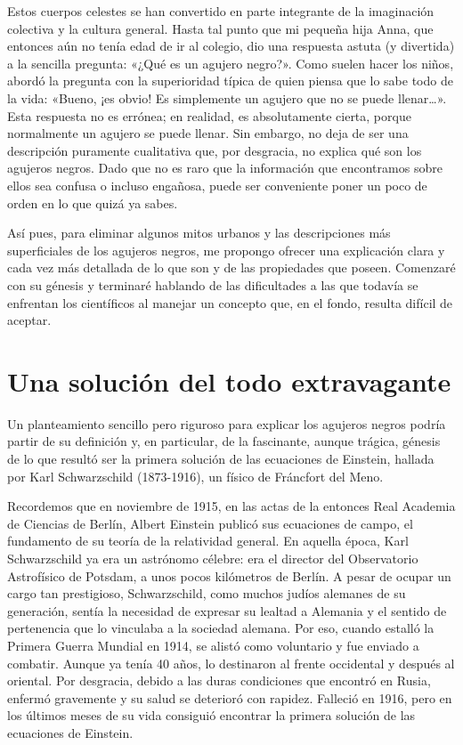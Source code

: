 Estos cuerpos celestes se han convertido en parte integrante de la imaginación colectiva y la cultura general. Hasta tal punto que mi pequeña hija Anna, que entonces aún no tenía edad de ir al colegio, dio una respuesta astuta (y divertida) a la sencilla pregunta: «¿Qué es un agujero negro?». Como suelen hacer los niños, abordó la pregunta con la superioridad típica de quien piensa que lo sabe todo de la vida: «Bueno, ¡es obvio! Es simplemente un agujero que no se puede llenar…». Esta respuesta no es errónea; en realidad, es absolutamente cierta, porque normalmente un agujero se puede llenar. Sin embargo, no deja de ser una descripción puramente cualitativa que, por desgracia, no explica qué son los agujeros negros. Dado que no es raro que la información que encontramos sobre ellos sea confusa o incluso engañosa, puede ser conveniente poner un poco de orden en lo que quizá ya sabes.

Así pues, para eliminar algunos mitos urbanos y las descripciones más superficiales de los agujeros negros, me propongo ofrecer una explicación clara y cada vez más detallada de lo que son y de las propiedades que poseen. Comenzaré con su génesis y terminaré hablando de las dificultades a las que todavía se enfrentan los científicos al manejar un concepto que, en el fondo, resulta difícil de aceptar.

\section{Una solución del todo extravagante}\label{sec:06-solution}

Un planteamiento sencillo pero riguroso para explicar los agujeros negros podría partir de su definición y, en particular, de la fascinante, aunque trágica, génesis de lo que resultó ser la primera solución de las ecuaciones de Einstein, hallada por Karl Schwarzschild (1873-1916), un físico de Fráncfort del Meno.

Recordemos que en noviembre de 1915, en las actas de la entonces Real Academia de Ciencias de Berlín, Albert Einstein publicó sus ecuaciones de campo, el fundamento de su teoría de la relatividad general. En aquella época, Karl Schwarzschild ya era un astrónomo célebre: era el director del Observatorio Astrofísico de Potsdam, a unos pocos kilómetros de Berlín. A pesar de ocupar un cargo tan prestigioso, Schwarzschild, como muchos judíos alemanes de su generación, sentía la necesidad de expresar su lealtad a Alemania y el sentido de pertenencia que lo vinculaba a la sociedad alemana. Por eso, cuando estalló la Primera Guerra Mundial en 1914, se alistó como voluntario y fue enviado a combatir. Aunque ya tenía 40 años, lo destinaron al frente occidental y después al oriental. Por desgracia, debido a las duras condiciones que encontró en Rusia, enfermó gravemente y su salud se deterioró con rapidez. Falleció en 1916, pero en los últimos meses de su vida consiguió encontrar la primera solución de las ecuaciones de Einstein.

